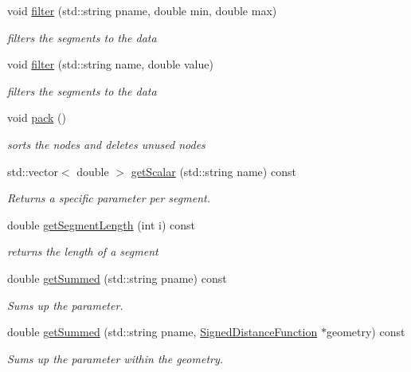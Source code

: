 \begin{DoxyCompactItemize}
void \hyperlink{classCPlantBox_1_1SegmentAnalyser_a23c673b6bca999d2ed47059e3e708f86}{filter} (std\+::string pname, double min, double max)
\begin{DoxyCompactList}\small\item\em filters the segments to the data \end{DoxyCompactList}\item 
void \hyperlink{classCPlantBox_1_1SegmentAnalyser_add2f750bb9f709e0bc0d9d187ad03277}{filter} (std\+::string name, double value)
\begin{DoxyCompactList}\small\item\em filters the segments to the data \end{DoxyCompactList}\item 
void \hyperlink{classCPlantBox_1_1SegmentAnalyser_a488c906a2b685e6e50d990c2bb617607}{pack} ()
\begin{DoxyCompactList}\small\item\em sorts the nodes and deletes unused nodes \end{DoxyCompactList}\item 
std\+::vector$<$ double $>$ \hyperlink{classCPlantBox_1_1SegmentAnalyser_a00b162007d72a6ba4adf48972cd0f9bf}{get\+Scalar} (std\+::string name) const
\begin{DoxyCompactList}\small\item\em Returns a specific parameter per segment. \end{DoxyCompactList}\item 
double \hyperlink{classCPlantBox_1_1SegmentAnalyser_aa223aa2a58d0eb0b910ccfe03877b78e}{get\+Segment\+Length} (int i) const
\begin{DoxyCompactList}\small\item\em returns the length of a segment \end{DoxyCompactList}\item 
double \hyperlink{classCPlantBox_1_1SegmentAnalyser_a77c317cdd72d22e4e2181761b59dab76}{get\+Summed} (std\+::string pname) const
\begin{DoxyCompactList}\small\item\em Sums up the parameter. \end{DoxyCompactList}\item 
double \hyperlink{classCPlantBox_1_1SegmentAnalyser_a1eab5114bd706b4942721d1f8deea328}{get\+Summed} (std\+::string pname, \hyperlink{classCPlantBox_1_1SignedDistanceFunction}{Signed\+Distance\+Function} $\ast$geometry) const
\begin{DoxyCompactList}\small\item\em Sums up the parameter within the geometry. \end{DoxyCompactList}\item 

\end{DoxyCompactItemize}
